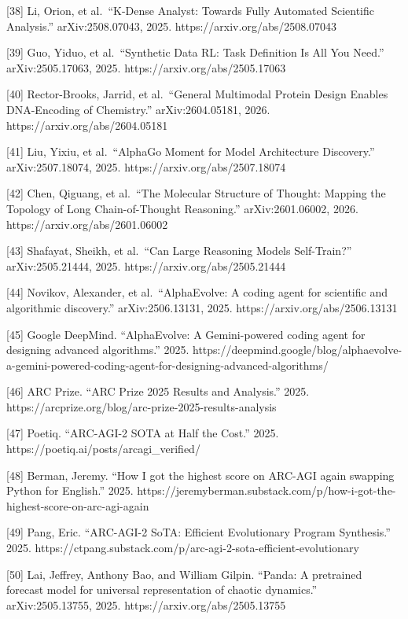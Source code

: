 \documentclass[
  11pt,
]{article}
\begin{document}
{[}38{]} Li, Orion, et al.~``K-Dense Analyst: Towards Fully Automated
Scientific Analysis.'' arXiv:2508.07043, 2025.
https://arxiv.org/abs/2508.07043

{[}39{]} Guo, Yiduo, et al.~``Synthetic Data RL: Task Definition Is All
You Need.'' arXiv:2505.17063, 2025. https://arxiv.org/abs/2505.17063

{[}40{]} Rector-Brooks, Jarrid, et al.~``General Multimodal Protein
Design Enables DNA-Encoding of Chemistry.'' arXiv:2604.05181, 2026.
https://arxiv.org/abs/2604.05181

{[}41{]} Liu, Yixiu, et al.~``AlphaGo Moment for Model Architecture
Discovery.'' arXiv:2507.18074, 2025. https://arxiv.org/abs/2507.18074

{[}42{]} Chen, Qiguang, et al.~``The Molecular Structure of Thought:
Mapping the Topology of Long Chain-of-Thought Reasoning.''
arXiv:2601.06002, 2026. https://arxiv.org/abs/2601.06002

{[}43{]} Shafayat, Sheikh, et al.~``Can Large Reasoning Models
Self-Train?'' arXiv:2505.21444, 2025. https://arxiv.org/abs/2505.21444

{[}44{]} Novikov, Alexander, et al.~``AlphaEvolve: A coding agent for
scientific and algorithmic discovery.'' arXiv:2506.13131, 2025.
https://arxiv.org/abs/2506.13131

{[}45{]} Google DeepMind. ``AlphaEvolve: A Gemini-powered coding agent
for designing advanced algorithms.'' 2025.
https://deepmind.google/blog/alphaevolve-a-gemini-powered-coding-agent-for-designing-advanced-algorithms/

{[}46{]} ARC Prize. ``ARC Prize 2025 Results and Analysis.'' 2025.
https://arcprize.org/blog/arc-prize-2025-results-analysis

{[}47{]} Poetiq. ``ARC-AGI-2 SOTA at Half the Cost.'' 2025.
https://poetiq.ai/posts/arcagi\_verified/

{[}48{]} Berman, Jeremy. ``How I got the highest score on ARC-AGI again
swapping Python for English.'' 2025.
https://jeremyberman.substack.com/p/how-i-got-the-highest-score-on-arc-agi-again

{[}49{]} Pang, Eric. ``ARC-AGI-2 SoTA: Efficient Evolutionary Program
Synthesis.'' 2025.
https://ctpang.substack.com/p/arc-agi-2-sota-efficient-evolutionary

{[}50{]} Lai, Jeffrey, Anthony Bao, and William Gilpin. ``Panda: A
pretrained forecast model for universal representation of chaotic
dynamics.'' arXiv:2505.13755, 2025. https://arxiv.org/abs/2505.13755
\end{document}
